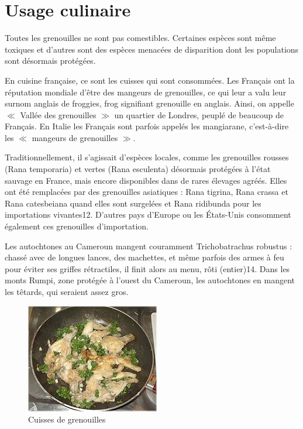 \section{Usage culinaire}

Toutes les grenouilles ne sont pas comestibles. 
Certaines espèces sont même toxiques et d'autres sont des espèces menacées de disparition dont les populations sont désormais protégées.

En cuisine française, ce sont les cuisses qui sont consommées. 
Les Français ont la réputation mondiale d'être des mangeurs de grenouilles, ce qui leur a valu leur surnom anglais de froggies, frog signifiant grenouille en anglais. 
Ainsi, on appelle $\ll$ Vallée des grenouilles $\gg$ un quartier de Londres, peuplé de beaucoup de Français.
En Italie les Français sont parfois appelés les mangiarane, c'est-à-dire les $\ll$ mangeurs de grenouilles $\gg$.

Traditionnellement, il s'agissait d'espèces locales, comme les grenouilles rousses (Rana temporaria) et vertes (Rana esculenta) désormais protégées à l'état sauvage en France, mais encore disponibles dans de rares élevages agréés. 
Elles ont été remplacées par des grenouilles asiatiques : Rana tigrina, Rana crassa et Rana catesbeiana quand elles sont surgelées et Rana ridibunda pour les importations vivantes12.
D'autres pays d'Europe ou les États-Unis consomment également ces grenouilles d'importation.

Les autochtones au Cameroun mangent couramment Trichobatrachus robustus : chassé avec de longues lances, des machettes, et même parfois des armes à feu pour éviter ses griffes rétractiles, il finit alors au menu, rôti (entier)14. 
Dans les monts Rumpi, zone protégée à l'ouest du Cameroun, les autochtones en mangent les têtards, qui seraient assez gros.

\begin{figure}
	\begin{center}
		\includegraphics[scale=1]{cuisine/miam.JPG}
			\caption{Cuisses de grenouilles}
			\label{fig:gre}
	\end{center}
\end{figure}